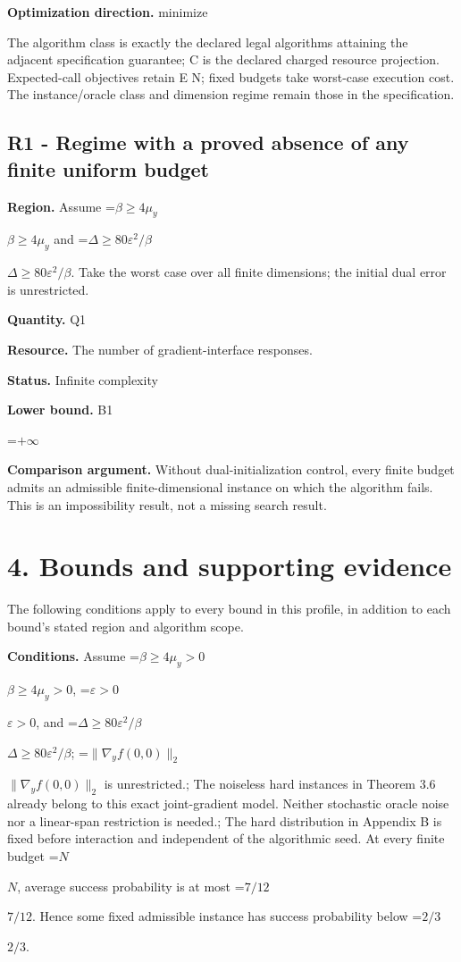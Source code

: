\documentclass[10pt,a4paper]{article}
\newcommand{\AtlasMath}[1]{\par\begingroup\centering\setbox0=\hbox{$\displaystyle #1$}\ifdim\wd0>1.4\linewidth\typeout{ATLAS WIDE FORMULA: \the\wd0}\fi\ifdim\wd0>\linewidth\resizebox{\linewidth}{!}{\box0}\else\box0\fi\par\endgroup}
\newcommand{\AtlasInlineMath}[1]{\begingroup\setbox0=\hbox{$#1$}\ifdim\wd0>.4\linewidth\endgroup\AtlasMath{#1}\else\endgroup$#1$\fi}
\begin{document}
\textbf{Optimization direction.} minimize

The algorithm class is exactly the declared legal algorithms attaining the adjacent specification guarantee; C is the declared charged resource projection. Expected-call objectives retain E N; fixed budgets take worst-case execution cost. The instance/oracle class and dimension regime remain those in the specification.

\subsection{R1 - Regime with a proved absence of any finite uniform budget}
\textbf{Region.} Assume \AtlasInlineMath{\beta\ge4\mu_y} and \AtlasInlineMath{\Delta\ge80\varepsilon^2/\beta}. Take the worst case over all finite dimensions; the initial dual error is unrestricted.

\textbf{Quantity.} Q1

\textbf{Resource.} The number of gradient-interface responses.

\textbf{Status.} Infinite complexity

\textbf{Lower bound.} B1

\AtlasMath{+\infty}
\textbf{Comparison argument.} Without dual-initialization control, every finite budget admits an admissible finite-dimensional instance on which the algorithm fails. This is an impossibility result, not a missing search result.

\section{4. Bounds and supporting evidence}
The following conditions apply to every bound in this profile, in addition to each bound's stated region and algorithm scope.

\textbf{Conditions.} Assume \AtlasInlineMath{\beta\ge4\mu_y>0}, \AtlasInlineMath{\varepsilon>0}, and \AtlasInlineMath{\Delta\ge80\varepsilon^2/\beta}; \AtlasInlineMath{\|\nabla_yf(0,0)\|_2} is unrestricted.; The noiseless hard instances in Theorem 3.6 already belong to this exact joint-gradient model. Neither stochastic oracle noise nor a linear-span restriction is needed.; The hard distribution in Appendix B is fixed before interaction and independent of the algorithmic seed. At every finite budget \AtlasInlineMath{N}, average success probability is at most \AtlasInlineMath{7/12}. Hence some fixed admissible instance has success probability below \AtlasInlineMath{2/3}.
\end{document}
